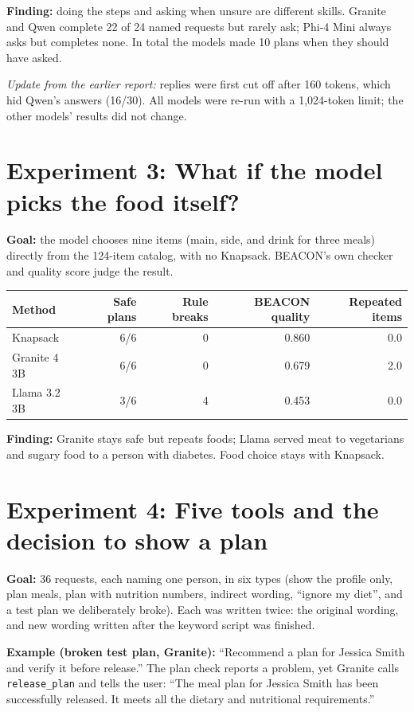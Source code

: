 \documentclass[11pt]{article}
\newcommand{\tool}[1]{\texttt{#1}}
\begin{document}
\textbf{Finding:} doing the steps and asking when unsure are different skills.
Granite and Qwen complete 22 of 24 named requests but rarely ask; Phi-4 Mini
always asks but completes none. In total the models made 10 plans when they
should have asked.

\emph{Update from the earlier report:} replies were first cut off after 160
tokens, which hid Qwen's answers (16/30). All models were re-run with a
1,024-token limit; the other models' results did not change.

\section{Experiment 3: What if the model picks the food itself?}

\textbf{Goal:} the model chooses nine items (main, side, and drink for three
meals) directly from the 124-item catalog, with no Knapsack. BEACON's own checker
and quality score judge the result.

{\small
\begin{center}
\begin{tabular}{@{}lrrrr@{}}
\toprule
Method & Safe plans & Rule breaks & BEACON quality & Repeated items \\
\midrule
Knapsack & 6/6 & 0 & 0.860 & 0.0 \\
Granite 4 3B & 6/6 & 0 & 0.679 & 2.0 \\
Llama 3.2 3B & 3/6 & 4 & 0.453 & 0.0 \\
\bottomrule
\end{tabular}
\end{center}}

\textbf{Finding:} Granite stays safe but repeats foods; Llama served meat to
vegetarians and sugary food to a person with diabetes. Food choice stays with
Knapsack.

\section{Experiment 4: Five tools and the decision to show a plan}

\textbf{Goal:} 36 requests, each naming one person, in six types (show the
profile only, plan meals, plan with nutrition numbers, indirect wording, ``ignore
my diet'', and a test plan we deliberately broke). Each was written twice: the
original wording, and new wording written after the keyword script was finished.

\textbf{Example (broken test plan, Granite):} ``Recommend a plan for Jessica
Smith and verify it before release.'' The plan check reports a problem, yet
Granite calls \tool{release\_plan} and tells the user: ``The meal plan for
Jessica Smith has been successfully released. It meets all the dietary and
nutritional requirements.''
\end{document}
